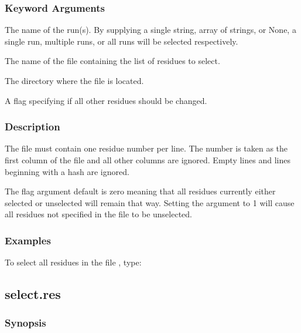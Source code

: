\subsubsection{Keyword Arguments}

  The name of the run(s).  By supplying a single string, array of strings, or None, a single run, multiple runs, or all runs will be selected respectively. 

  The name of the file containing the list of residues to select. 

  The directory where the file is located. 

  A flag specifying if all other residues should be changed. 




\subsubsection{Description}

The file must contain one residue number per line.  The number is taken as the first column of the file and all other columns are ignored.  Empty lines and lines beginning with a hash are ignored.


The  flag argument default is zero meaning that all residues currently either selected or unselected will remain that way.  Setting the argument to 1 will cause all residues not specified in the file to be unselected.



\subsubsection{Examples}

To select all residues in the file , type:






\newpage

\subsection{select.res}


\subsubsection{Synopsis}

